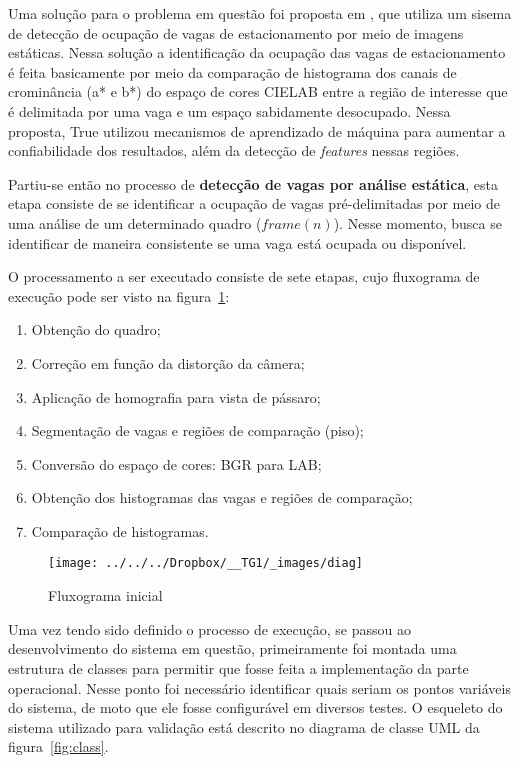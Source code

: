 \documentclass[ecp,tc]{iiufrgs}
\begin{document}
Uma solução para o problema em questão foi proposta em , que utiliza um sisema de detecção de ocupação de vagas de estacionamento por meio de imagens estáticas. Nessa solução a identificação da ocupação das vagas de estacionamento é feita basicamente por meio da comparação de histograma dos canais de crominância (a* e b*) do espaço de cores CIELAB entre a região de interesse que é delimitada por uma vaga e um espaço sabidamente desocupado. Nessa proposta, True utilizou mecanismos de aprendizado de máquina para aumentar a confiabilidade dos resultados, além da detecção de \textit{features} nessas regiões.

Partiu-se então no processo de \textbf{detecção de vagas por análise estática}, esta etapa consiste de se identificar a ocupação de vagas pré-delimitadas por meio de uma análise de um determinado quadro ($ frame(n) $). Nesse momento, busca se identificar de maneira consistente se uma vaga está ocupada ou disponível.

O processamento a ser executado consiste de sete etapas, cujo fluxograma de execução pode ser visto na figura~\ref{fig:fluxo}:
\begin{enumerate}
	\item Obtenção do quadro;
	\item Correção em função da distorção da câmera;
	\item Aplicação de homografia para vista de pássaro;
	\item Segmentação de vagas e regiões de comparação (piso);
	\item Conversão do espaço de cores: BGR para LAB;
	\item Obtenção dos histogramas das vagas e regiões de comparação;
	\item Comparação de histogramas.
\end{enumerate}

\begin{figure}
	\centering
	\caption{Fluxograma inicial}
	\texttt{[image: ../../../Dropbox/\_\_TG1/\_images/diag]}
	\label{fig:fluxo}
\end{figure}

Uma vez tendo sido definido o processo de execução, se passou ao desenvolvimento do sistema em questão, primeiramente foi montada uma estrutura de classes para permitir que fosse feita a implementação da parte operacional. Nesse ponto foi necessário identificar quais seriam os pontos variáveis do sistema, de moto que ele fosse configurável em diversos testes. O esqueleto do sistema utilizado para validação está descrito no diagrama de classe UML da figura~\ref{fig:class}.
\end{document}
